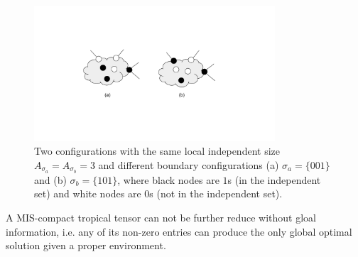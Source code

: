 \documentclass[review,onefignum,onetabnum]{siamart190516}
\newcommand{\<}{\langle}
\renewcommand{\>}{\rangle}
\begin{document}
\begin{figure}
    \centering
    \includegraphics[width=0.8\textwidth, trim={5cm 4cm 5cm 4cm}, clip]{compressionrule.pdf}
    \caption{Two configurations with the same local independent size $A_{\sigma_a} = A_{\sigma_b} = 3$ and different boundary configurations (a) $\sigma_a=\{001\}$ and (b) $\sigma_b = \{101\}$, where black nodes are $1$s (in the independent set) and white nodes are $0$s (not in the independent set).}\label{fig:compactifying}
\end{figure}

\begin{theorem}
    A MIS-compact tropical tensor can not be further reduce without gloal information, i.e. any of its non-zero entries can produce the only global optimal solution given a proper environment.
\end{theorem}
\end{document}
